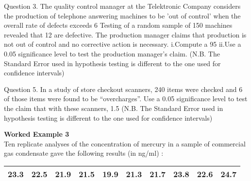 Question 3.
The quality control manager at the Telektronic Company considers the production of telephone answering machines to be ’out of control’ when the overall rate of defects exceeds 6%
Testing of a random sample of 150 machines revealed that 12 are defective. The production manager claims that production is not out of control and no corrective action is necessary.
i.Compute a 95%
ii.Use a 0.05 significance level to test the production manager’s claim.
(N.B. The Standard Error used in hypothesis testing is different to the one used for confidence intervals)



Question 5.
In a study of store checkout scanners, 240 items were checked and 6 of those items were found to be “overcharges”.
Use a 0.05 significance level to test the claim that with these scanners, 1.5 %
(N.B. The Standard Error used in hypothesis testing is different to the one used for confidence intervals)

\item \textbf{Worked Example 3} \\ Ten replicate analyses of the concentration
of mercury in a sample of commercial gas condensate gave the
following results (in ng/ml) :

\begin{tabular}{|c|c|c|c|c|c|c|c|c|c|}
\hline
23.3 & 22.5 & 21.9 & 21.5 & 19.9 & 21.3 & 21.7 & 23.8 & 22.6 &
24.7\\
\hline
\end{tabular}



